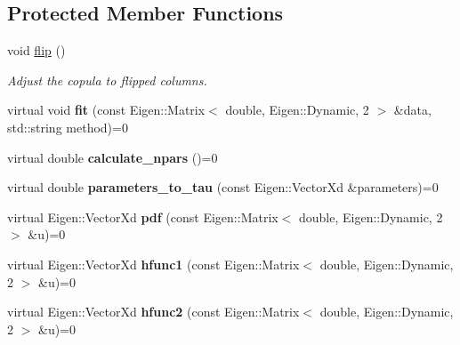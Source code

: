 \subsection*{Protected Member Functions}
\begin{DoxyCompactItemize}
\item 
void \hyperlink{classvinecopulib_1_1_abstract_bicop_a4e62970bb8e533f97f66c280c1a908cf}{flip} ()\hypertarget{classvinecopulib_1_1_abstract_bicop_a4e62970bb8e533f97f66c280c1a908cf}{}\label{classvinecopulib_1_1_abstract_bicop_a4e62970bb8e533f97f66c280c1a908cf}

\begin{DoxyCompactList}\small\item\em Adjust the copula to flipped columns. \end{DoxyCompactList}\item 
virtual void {\bfseries fit} (const Eigen\+::\+Matrix$<$ double, Eigen\+::\+Dynamic, 2 $>$ \&data, std\+::string method)=0\hypertarget{classvinecopulib_1_1_abstract_bicop_ad77e75d1b9336e96940b7574f3f184f7}{}\label{classvinecopulib_1_1_abstract_bicop_ad77e75d1b9336e96940b7574f3f184f7}

\item 
virtual double {\bfseries calculate\+\_\+npars} ()=0\hypertarget{classvinecopulib_1_1_abstract_bicop_af460c2a5a6d2743080b3a883182cd78e}{}\label{classvinecopulib_1_1_abstract_bicop_af460c2a5a6d2743080b3a883182cd78e}

\item 
virtual double {\bfseries parameters\+\_\+to\+\_\+tau} (const Eigen\+::\+Vector\+Xd \&parameters)=0\hypertarget{classvinecopulib_1_1_abstract_bicop_a71ba68887d581483bd51697885dc2d8c}{}\label{classvinecopulib_1_1_abstract_bicop_a71ba68887d581483bd51697885dc2d8c}

\item 
virtual Eigen\+::\+Vector\+Xd {\bfseries pdf} (const Eigen\+::\+Matrix$<$ double, Eigen\+::\+Dynamic, 2 $>$ \&u)=0\hypertarget{classvinecopulib_1_1_abstract_bicop_a4594c3b99a7f2d949a52bf177b1651c3}{}\label{classvinecopulib_1_1_abstract_bicop_a4594c3b99a7f2d949a52bf177b1651c3}

\item 
virtual Eigen\+::\+Vector\+Xd {\bfseries hfunc1} (const Eigen\+::\+Matrix$<$ double, Eigen\+::\+Dynamic, 2 $>$ \&u)=0\hypertarget{classvinecopulib_1_1_abstract_bicop_a2dece0c5a4690e18e8407ea9078522fd}{}\label{classvinecopulib_1_1_abstract_bicop_a2dece0c5a4690e18e8407ea9078522fd}

\item 
virtual Eigen\+::\+Vector\+Xd {\bfseries hfunc2} (const Eigen\+::\+Matrix$<$ double, Eigen\+::\+Dynamic, 2 $>$ \&u)=0\hypertarget{classvinecopulib_1_1_abstract_bicop_a604690344660208cbf7a14aed322d0c6}{}\label{classvinecopulib_1_1_abstract_bicop_a604690344660208cbf7a14aed322d0c6}


\end{DoxyCompactItemize}
